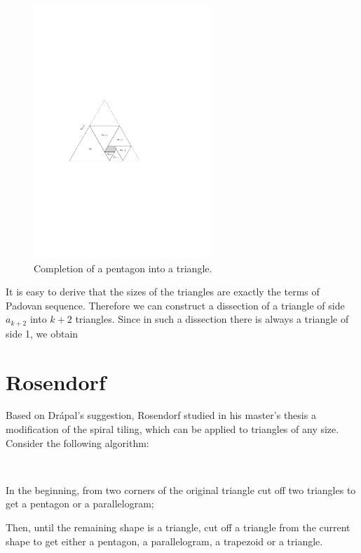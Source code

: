 \begin{figure}[htb]
\centering
\includegraphics[width=0.6\textwidth]{img/spiral_triangle.pdf}
\caption{Completion of a pentagon into a triangle.}
\label{fig:spiral2}
\end{figure}

It is easy to derive that the sizes of the triangles are exactly the terms of Padovan sequence. Therefore we can construct a dissection of a triangle of side $a_{k+2}$ into $k+2$ triangles. Since in such a dissection there is always a triangle of side 1, we obtain
%


\section{Rosendorf}
Based on Drápal's suggestion, Rosendorf studied in his master's thesis \cite{Rosendorf04} a modification of the spiral tiling, which can be applied to triangles of any size. Consider the following algorithm:

\begin{alg} \ 
	\begin{cosyitemize}
		\item In the beginning, from two corners of the original triangle cut off two triangles to get a pentagon or a parallelogram;
		\item Then, until the remaining shape is a triangle, cut off a triangle from the current shape to get either a pentagon, a parallelogram, a trapezoid or a triangle.
	\end{cosyitemize}
\end{alg}%

